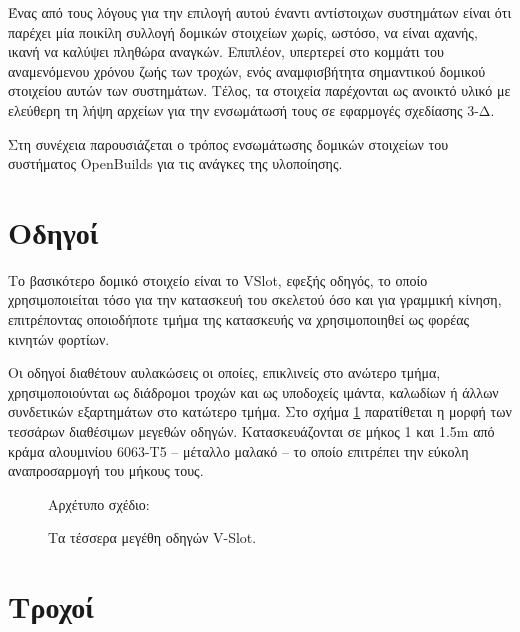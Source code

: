 Ένας από τους λόγους για την επιλογή αυτού έναντι αντίστοιχων συστημάτων είναι
ότι παρέχει μία ποικίλη συλλογή δομικών στοιχείων χωρίς, ωστόσο, να είναι
αχανής, ικανή να καλύψει πληθώρα αναγκών. Επιπλέον, υπερτερεί στο κομμάτι του
αναμενόμενου χρόνου ζωής των τροχών, ενός αναμφισβήτητα σημαντικού δομικού
στοιχείου αυτών των συστημάτων. Τέλος, τα στοιχεία παρέχονται ως ανοικτό υλικό
με ελεύθερη τη λήψη αρχείων για την ενσωμάτωσή τους σε εφαρμογές σχεδίασης 3-Δ.


Στη συνέχεια παρουσιάζεται ο τρόπος ενσωμάτωσης δομικών στοιχείων του συστήματος
OpenBuilds για τις ανάγκες της υλοποίησης.

\section{Οδηγοί}

Το βασικότερο δομικό στοιχείο είναι το VSlot, εφεξής οδηγός, το οποίο
χρησιμοποιείται τόσο για την κατασκευή του σκελετού όσο και για γραμμική κίνηση,
επιτρέποντας οποιοδήποτε τμήμα της κατασκευής να χρησιμοποιηθεί ως φορέας
κινητών φορτίων.

Οι οδηγοί διαθέτουν αυλακώσεις οι οποίες, επικλινείς στο ανώτερο τμήμα,
χρησιμοποιούνται ως διάδρομοι τροχών και ως υποδοχείς ιμάντα, καλωδίων ή άλλων
συνδετικών εξαρτημάτων στο κατώτερο τμήμα.
Στο σχήμα \ref{fig:construct:vslot} παρατίθεται η μορφή των τεσσάρων διαθέσιμων
μεγεθών οδηγών.
Κατασκευάζονται σε μήκος 1 και 1.5m από κράμα αλουμινίου 6063-T5 -- μέταλλο
μαλακό -- το οποίο επιτρέπει την εύκολη αναπροσαρμογή του μήκους τους.

\begin{figure}
    \caption{Τα τέσσερα μεγέθη οδηγών V-Slot.
    \label{fig:construct:vslot}}
    \begin{center}%
    \def\svgwidth{0.8\textwidth}
    
    \end{center}

    Αρχέτυπο σχέδιο:
\end{figure}

\section{Τροχοί}

